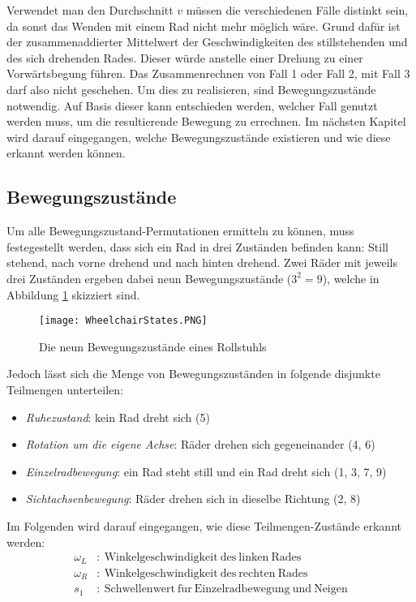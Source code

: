 Verwendet man den Durchschnitt $v$ müssen die verschiedenen Fälle distinkt sein, da sonst das Wenden mit einem Rad nicht mehr möglich wäre.
Grund dafür ist der zusammenaddierter Mittelwert der Geschwindigkeiten des stillstehenden und des sich drehenden Rades.
Dieser würde anstelle einer Drehung zu einer Vorwärtsbegung führen.
Das Zusammenrechnen von Fall 1 oder Fall 2, mit Fall 3 darf also nicht geschehen.
Um dies zu realisieren, sind Bewegungszustände notwendig.
Auf Basis dieser kann entschieden werden, welcher Fall genutzt werden muss, um die resultierende Bewegung zu errechnen.
Im nächsten Kapitel wird darauf eingegangen, welche Bewegungszustände existieren und wie diese erkannt werden können.

\subsection{Bewegungszustände}
Um alle Bewegungszustand-Permutationen ermitteln zu können, muss festegestellt werden, dass sich ein Rad in drei Zuständen befinden kann: Still stehend, nach vorne drehend und nach hinten drehend.
Zwei Räder mit jeweils drei Zuständen ergeben dabei neun Bewegungszustände ($3^2 = 9$), welche in Abbildung \ref{fig:wheelstates} skizziert sind.

\begin{figure}[h]
    \centering
    \texttt{[image: WheelchairStates.PNG]}
    \caption{Die neun Bewegungszustände eines Rollstuhls}
    \label{fig:wheelstates}
\end{figure}

Jedoch lässt sich die Menge von Bewegungszuständen in folgende disjunkte Teilmengen unterteilen:
\begin{itemize}
    \item \textit{Ruhezustand}: kein Rad dreht sich (5)
    \item \textit{Rotation um die eigene Achse}: Räder drehen sich gegeneinander (4, 6)
    \item \textit{Einzelradbewegung}: ein Rad steht still und ein Rad dreht sich (1, 3, 7, 9)
    \item \textit{Sichtachsenbewegung}: Räder drehen sich in dieselbe Richtung (2, 8)
\end{itemize}

Im Folgenden wird darauf eingegangen, wie diese Teilmengen-Zustände erkannt werden:
\begin{align}
    \omega_L & :\ \mathrm{Winkelgeschwindigkeit\ des\ linken\ Rades}                 \\
    \omega_R & :\ \mathrm{Winkelgeschwindigkeit\ des\ rechten\ Rades}                \\
    s_1      & :\ \mathrm{Schwellenwert\ f\ddot{u}r\ Einzelradbewegung\ und\ Neigen}
\end{align}

